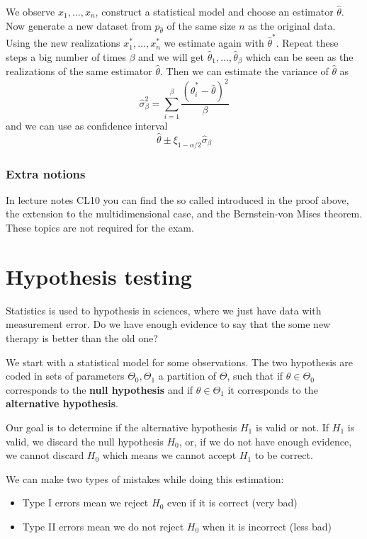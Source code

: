 \documentclass[12pt]{extarticle}
\begin{document}
We observe $x_1, \dots, x_n$, construct a statistical model and choose an estimator $\hat \theta$.
Now generate a new dataset from $p_{\hat\theta}$ of the same size $n$ as the original data.
Using the new realizations $x_1^*, \dots, x_n^*$ we estimate again with $\hat \theta^*$.
Repeat these steps a big number of times $\beta$ and we will get $\hat \theta_1, \dots, \hat \theta_\beta$ which can be seen as the realizations of the same estimator $\hat \theta$.
Then we can estimate the variance of $\hat \theta$ as
\begin{equation}
	\hat \sigma_{\beta}^2 = \sum_{i = 1}^\beta \frac{(\hat \theta_i^* - \hat \theta)^2}{\beta}
\end{equation}
and we can use as confidence interval
\begin{equation}
	\hat \theta \pm \xi_{1 - \alpha/2} \hat \sigma_\beta
\end{equation}

\subsubsection{Extra notions}

In lecture notes CL10 you can find the so called  introduced in the proof above, the extension to the multidimensional case, and the Bernstein-von Mises theorem.
These topics are not required for the exam.

\section{Hypothesis testing}

Statistics is used to  hypothesis in sciences, where we just have data with measurement error.
Do we have enough evidence to say that the some new therapy is better than the old one?

We start with a statistical model for some observations.
The two hypothesis are coded in sets of parameters $\Theta_0, \Theta_1$ a partition of $\Theta$, such that if $\theta \in \Theta_0$ corresponds to the \textbf{null hypothesis} and if $\theta \in \Theta_1$ it corresponds to the \textbf{alternative hypothesis}.

Our goal is to determine if the alternative hypothesis $H_1$ is valid or not.
If $H_1$ is valid, we discard the null hypothesis $H_0$, or, if we do not have enough evidence, we cannot discard $H_0$ which means we cannot accept $H_1$ to be correct.

We can make two types of mistakes while doing this estimation:
\begin{itemize}
	\item Type I errors mean we reject $H_0$ even if it is correct (very bad)
	\item Type II errors mean we do not reject $H_0$ when it is incorrect (less bad)
\end{itemize}
\end{document}
